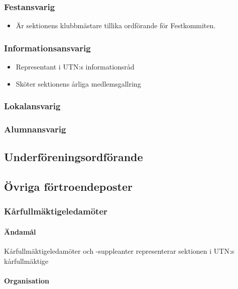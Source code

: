 \documentclass{../resources/dgovdoc}
\begin{document}
\subsubsection{Festansvarig}

\begin{itemize}
	\item Är sektionens klubbmästare tillika ordförande för Festkommiten.
\end{itemize}

\subsubsection{Informationsansvarig}

\begin{itemize}
	\item Representant i UTN:s informationsråd
	\item Sköter sektionens årliga medlemsgallring
\end{itemize}

\subsubsection{Lokalansvarig}

\subsubsection{Alumnansvarig}

\subsection{Underföreningsordförande}

\subsection{Övriga förtroendeposter}

\subsubsection{Kårfullmäktigeledamöter}

\paragraph{Ändamål}

Kårfullmäktigeledamöter och -suppleanter representerar sektionen i UTN:s kårfullmäktige

\paragraph{Organisation}
\end{document}
